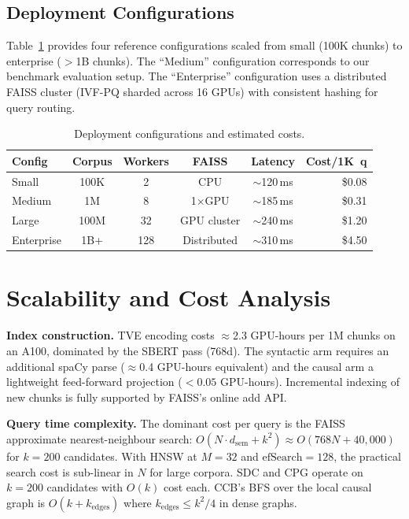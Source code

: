 \documentclass[10pt,twocolumn]{article}
\newcommand{\secvspace}{\vspace{-4pt}}
\begin{document}
\subsection{Deployment Configurations}

Table~\ref{tab:deploy_configs} provides four reference configurations
scaled from small (100K chunks) to enterprise ($>$1B chunks).  The
``Medium'' configuration corresponds to our benchmark evaluation setup.
The ``Enterprise'' configuration uses a distributed FAISS cluster (IVF-PQ
sharded across 16 GPUs) with consistent hashing for query routing.

\begin{table}[h]
\centering
\caption{Deployment configurations and estimated costs.}
\label{tab:deploy_configs}
\footnotesize
\setlength{\tabcolsep}{3pt}
\begin{tabular}{@{}lccccr@{}}
\toprule
\textbf{Config} & \textbf{Corpus} & \textbf{Workers} & \textbf{FAISS} &
\textbf{Latency} & \textbf{Cost/1K~q} \\
\midrule
Small      & 100K  & 2   & CPU           & $\sim$120\,ms & \$0.08 \\
Medium     & 1M    & 8   & 1$\times$GPU  & $\sim$185\,ms & \$0.31 \\
Large      & 100M  & 32  & GPU cluster   & $\sim$240\,ms & \$1.20 \\
Enterprise & 1B+   & 128 & Distributed   & $\sim$310\,ms & \$4.50 \\
\bottomrule
\end{tabular}
\end{table}

\section{Scalability and Cost Analysis}\label{sec:scale}
\secvspace

\noindent\textbf{Index construction.}
TVE encoding costs $\approx$2.3 GPU-hours per 1M chunks on an A100, dominated
by the SBERT pass (768d).  The syntactic arm requires an additional spaCy parse
($\approx$0.4 GPU-hours equivalent) and the causal arm a lightweight
feed-forward projection ($<0.05$ GPU-hours).  Incremental indexing of new
chunks is fully supported by FAISS's online add API.

\noindent\textbf{Query time complexity.}
The dominant cost per query is the FAISS approximate nearest-neighbour search:
$O(N\cdot d_\text{sem} + k^2) \approx O(768N + 40{,}000)$ for $k=200$ candidates.
With HNSW at $M=32$ and $\text{efSearch}=128$, the practical search cost is
sub-linear in $N$ for large corpora.  SDC and CPG operate on $k=200$ candidates
with $O(k)$ cost each.  CCB's BFS over the local causal graph is
$O(k + k_\text{edges})$ where $k_\text{edges} \leq k^2/4$ in dense graphs.
\end{document}
